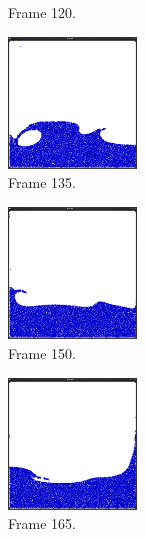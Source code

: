\begin{figure}[ht!]
\begin{subfigure}[]{0.3\textwidth}
\caption{Frame 120.}
\end{subfigure}
\begin{subfigure}[]{0.3\textwidth}
\includegraphics[height=35mm]{png/multigrid9.png}
\caption{Frame 135.}
\end{subfigure}
\begin{subfigure}[]{0.3\textwidth}
\includegraphics[height=35mm]{png/multigrid10.png}
\caption{Frame 150.}
\end{subfigure}
\begin{subfigure}[]{0.3\textwidth}
\includegraphics[height=35mm]{png/multigrid11.png}
\caption{Frame 165.}
\end{subfigure}
\caption{}
\label{appA}
\end{figure}

\newpage

